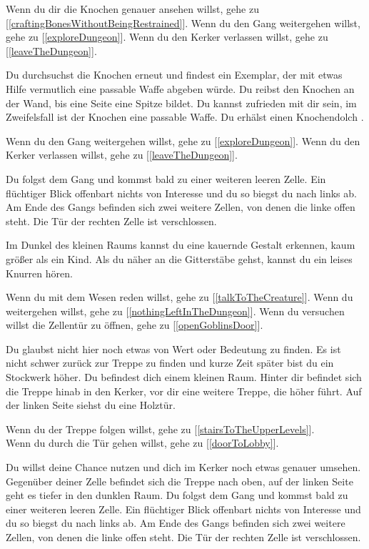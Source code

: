 Wenn du dir die Knochen genauer ansehen willst, gehe zu [\ref{craftingBonesWithoutBeingRestrained}].
Wenn du den Gang weitergehen willst, gehe zu [\ref{exploreDungeon}].
Wenn du den Kerker verlassen willst, gehe zu [\ref{leaveTheDungeon}].


Du durchsuchst die Knochen erneut und findest ein Exemplar, der mit etwas Hilfe vermutlich eine passable Waffe abgeben würde. Du reibst den Knochen an der Wand, bis eine Seite eine Spitze bildet. Du kannst zufrieden mit dir sein, im Zweifelsfall ist der Knochen eine passable Waffe.
Du erhälst einen Knochendolch .

Wenn du den Gang weitergehen willst, gehe zu [\ref{exploreDungeon}].
Wenn du den Kerker verlassen willst, gehe zu [\ref{leaveTheDungeon}].


Du folgst dem Gang und kommst bald zu einer weiteren leeren Zelle. Ein flüchtiger Blick offenbart nichts von Interesse und du so biegst du nach links ab. Am Ende des Gangs befinden sich zwei weitere Zellen, von denen die linke offen steht. Die Tür der rechten Zelle ist verschlossen.

Im Dunkel des kleinen Raums kannst du eine kauernde Gestalt erkennen, kaum größer als ein Kind.
Als du näher an die Gitterstäbe gehst, kannst du ein leises Knurren hören.

Wenn du mit dem Wesen reden willst, gehe zu [\ref{talkToTheCreature}].
Wenn du weitergehen willst, gehe zu [\ref{nothingLeftInTheDungeon}].
Wenn du versuchen willst die Zellentür zu öffnen, gehe zu [\ref{openGoblinsDoor}].


Du glaubst nicht hier noch etwas von Wert oder Bedeutung zu finden. Es ist nicht schwer zurück zur Treppe zu finden und kurze Zeit später bist du ein Stockwerk höher. Du befindest dich einem kleinen Raum. Hinter dir befindet sich die Treppe hinab in den Kerker, vor dir eine weitere Treppe, die höher führt. Auf der linken Seite siehst du eine Holztür.

Wenn du der Treppe folgen willst, gehe zu [\ref{stairsToTheUpperLevels}].
\\Wenn du durch die Tür gehen willst, gehe zu [\ref{doorToLobby}].

Du willst deine Chance nutzen und dich im Kerker noch etwas genauer umsehen. Gegenüber deiner Zelle befindet sich die Treppe nach oben, auf der linken Seite geht es tiefer in den dunklen Raum. Du folgst dem Gang und kommst bald zu einer weiteren leeren Zelle. Ein flüchtiger Blick offenbart nichts von Interesse und du so biegst du nach links ab. Am Ende des Gangs befinden sich zwei weitere Zellen, von denen die linke offen steht. Die Tür der rechten Zelle ist verschlossen.

